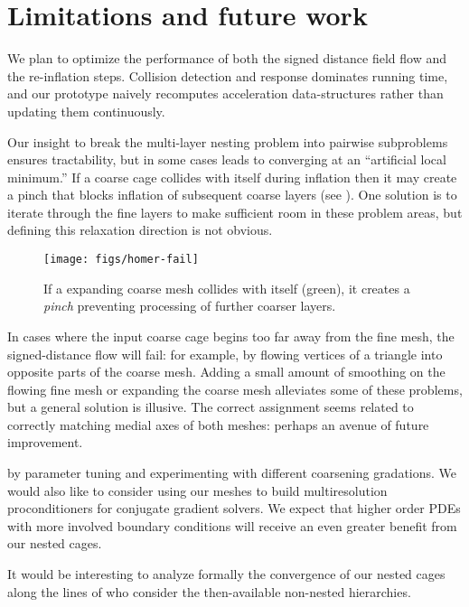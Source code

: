 \section{Limitations and future work}
\label{sec:conclusion}
%
We plan to optimize the performance of both the signed distance field flow and
the re-inflation steps.
%
Collision detection and response dominates running time, and our prototype
naively recomputes acceleration data-structures rather than updating them
continuously.

Our insight to break the multi-layer nesting problem into pairwise subproblems
ensures tractability, but in some cases leads to converging at an
``artificial local minimum.'' If a coarse cage collides with itself during
inflation then it may create a pinch that blocks inflation of subsequent coarse
layers (see ).
%
One solution is to iterate through the fine layers to make sufficient room in
these problem areas, but defining this relaxation direction is not obvious.

\begin{figure}
  \texttt{[image: figs/homer-fail]}
  \caption{If a expanding coarse mesh collides with itself (green), it creates
  a \emph{pinch} preventing processing of further coarser layers.}
  \label{fig:homer}
\end{figure}

In cases where the input coarse cage begins too far away from the fine mesh,
the signed-distance flow will fail: for example, by flowing vertices of a
triangle into opposite parts of the coarse mesh. 
%
Adding a small amount of smoothing on the flowing fine mesh or expanding the
coarse mesh alleviates some of these problems, but a general solution is
illusive.
%
The correct assignment seems related to correctly matching medial axes of both
meshes: perhaps an avenue of future improvement.

 by parameter tuning and experimenting with different coarsening
gradations. We would also like to consider using our meshes to build
multiresolution proconditioners for conjugate gradient solvers.
%
We expect that higher order PDEs with more involved boundary conditions will
receive an even greater benefit from our nested cages.

It would be interesting to analyze formally the convergence of our nested cages
along the lines of \cite{chan1996convergence} who consider the then-available
non-nested hierarchies.

